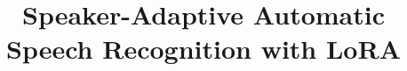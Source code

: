 \documentclass{Interspeech2024}
\title{Speaker-Adaptive Automatic Speech Recognition with LoRA}
\newcommand{\red}[1]{\textcolor{red}{#1}}
\begin{document}
\maketitle
















\begin{comment}
\begin{abstract}
    
    Manuscripts submitted to Interspeech 2024 must use this document as both an instruction set and as a template. Do not use a past paper as a template. Always start from a fresh copy, and read it all before replacing the content with your own. The main changes with respect to previous instructions are \red{highlighted in red}.
    Before submitting, check that your manuscript conforms to this template. If it does not, it may be rejected. Do not be tempted to adjust the format! Instead, edit your content to fit the allowed space. The maximum number of manuscript pages is 5. The 5th page is reserved exclusively for \red{acknowledgements} and references, which may begin on an earlier page if there is space.
    The abstract is limited to 1000 characters. The one in your manuscript and the one entered in the submission form must be identical. Avoid non-ASCII characters, symbols, maths, italics, etc as they may not display correctly in the abstract book. Do not use citations in the abstract: the abstract booklet will not include a bibliography.  Index terms appear immediately below the abstract. 
\end{abstract}
\section{Introduction}

Templates are provided on the conference website for Microsoft Word\textregistered, and \LaTeX. We strongly recommend \LaTeX\xspace
which can be used conveniently in a web browser on \url{overleaf.com} where this template is available in the Template Gallery.


\end{comment}
\end{document}
